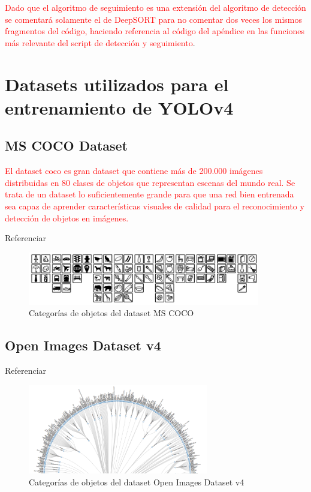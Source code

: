 \textcolor{red}{Dado que el algoritmo de seguimiento es una extensión del algoritmo de detección se comentará solamente el de DeepSORT para no comentar dos veces los mismos fragmentos del código, haciendo referencia al código del apéndice en las funciones más relevante del script de detección y seguimiento}.

\newpage

\section{Datasets utilizados para el entrenamiento de YOLOv4}
\label{sec:datasets-utilizados}

\subsection{MS COCO Dataset}
\label{subsec:coco-dataset}

\textcolor{red}{El dataset \gls{coco} es gran dataset que contiene más de 200.000 imágenes distribuidas en 80 clases de objetos que representan escenas del mundo real. Se trata de un dataset lo suficientemente grande para que una red bien entrenada sea capaz de aprender características visuales de calidad para el reconocimiento y detección de objetos en imágenes.}

Referenciar \cite{lin2015microsoft}

\begin{figure}[ht]
\centering
\includegraphics[width=0.9\textwidth]{img/chapters/resultados/datasets/cocodataset.png}
\caption{\label{fig:cocodataset}Categorías de objetos del dataset MS COCO}
\end{figure}

\newpage

\subsection{Open Images Dataset v4}
\label{subsec:OIDv4-dataset}

Referenciar \cite{Kuznetsova_2020}

\begin{figure}[ht]
\centering
\includegraphics[width=0.7\textwidth]{img/chapters/resultados/datasets/oid-classes.png}
\caption{\label{fig:oiddataset}Categorías de objetos del dataset Open Images Dataset v4}
\end{figure}

